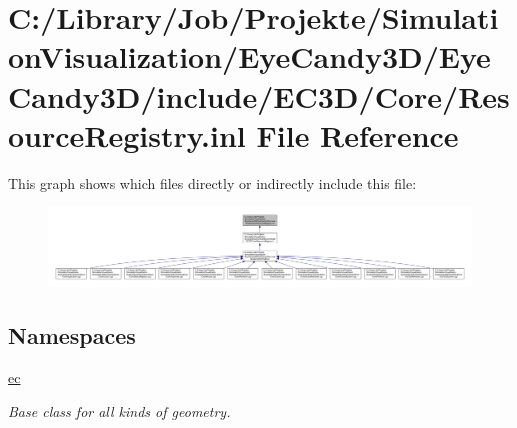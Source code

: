 \hypertarget{_resource_registry_8inl}{}\section{C\+:/\+Library/\+Job/\+Projekte/\+Simulation\+Visualization/\+Eye\+Candy3\+D/\+Eye\+Candy3\+D/include/\+E\+C3\+D/\+Core/\+Resource\+Registry.inl File Reference}
\label{_resource_registry_8inl}
This graph shows which files directly or indirectly include this file\+:\nopagebreak
\begin{figure}[H]
\begin{center}
\leavevmode
\includegraphics[width=350pt]{_resource_registry_8inl__dep__incl}
\end{center}
\end{figure}
\subsection*{Namespaces}
\begin{DoxyCompactItemize}
\item 
 \mbox{\hyperlink{namespaceec}{ec}}
\begin{DoxyCompactList}\small\item\em Base class for all kinds of geometry. \end{DoxyCompactList}\end{DoxyCompactItemize}
